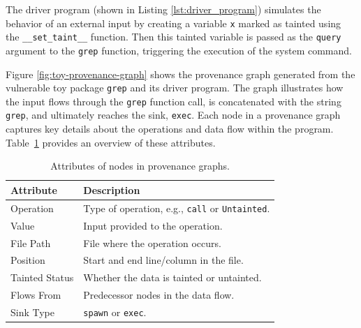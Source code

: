 \documentclass[12pt,openany,oneside,table]{cmuthesis}
\begin{document}
The driver program (shown in Listing \ref{lst:driver_program}) simulates the behavior of an external input by creating a variable \texttt{x} marked as tainted using the \texttt{\_\_set\_taint\_\_} function. Then this tainted variable is passed as the \texttt{query} argument to the \texttt{grep} function, triggering the execution of the system command.


Figure \ref{fig:toy-provenance-graph} shows the provenance graph generated from the vulnerable toy package \texttt{grep} and its driver program. The graph illustrates how the input flows through the \texttt{grep} function call, is concatenated with the string \texttt{grep}, and ultimately reaches the sink, \texttt{exec}.
Each node in a provenance graph captures key details about the operations and data flow within the program. Table~\ref{tab:node_attributes} provides an overview of these attributes.

\begin{table}[h]
\centering
\caption{Attributes of nodes in provenance graphs.\label{tab:node_attributes}}
\begin{tabular}{@{}ll@{}}
\toprule
\textbf{Attribute}          & \textbf{Description}                       \\ \midrule
Operation         & Type of operation, e.g., \texttt{call} or \texttt{Untainted}. \\ \midrule
Value             & Input provided to the operation.           \\ \midrule
File Path         & File where the operation occurs.           \\ \midrule
Position          & Start and end line/column in the file.     \\ \midrule
Tainted Status    & Whether the data is tainted or untainted.  \\ \midrule
Flows From        & Predecessor nodes in the data flow.        \\ \midrule
Sink Type         & \texttt{spawn} or \texttt{exec}. \\ \bottomrule
\end{tabular}
\end{table}
\end{document}
